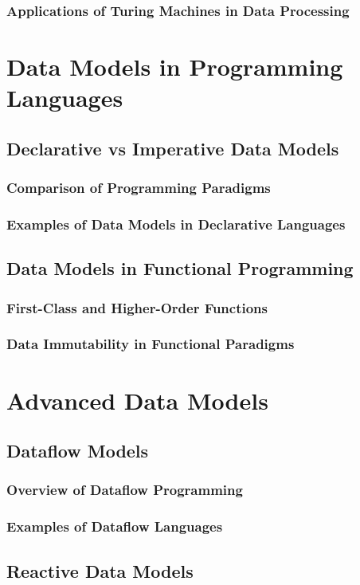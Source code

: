 \documentclass[12pt, oneside]{book}
\begin{document}
\subsubsection{Applications of Turing Machines in Data Processing}
\section{Data Models in Programming Languages}
\subsection{Declarative vs Imperative Data Models}
\subsubsection{Comparison of Programming Paradigms}
\subsubsection{Examples of Data Models in Declarative Languages}
\subsection{Data Models in Functional Programming}
\subsubsection{First-Class and Higher-Order Functions}
\subsubsection{Data Immutability in Functional Paradigms}
\section{Advanced Data Models}
\subsection{Dataflow Models}
\subsubsection{Overview of Dataflow Programming}
\subsubsection{Examples of Dataflow Languages}
\subsection{Reactive Data Models}
\end{document}
